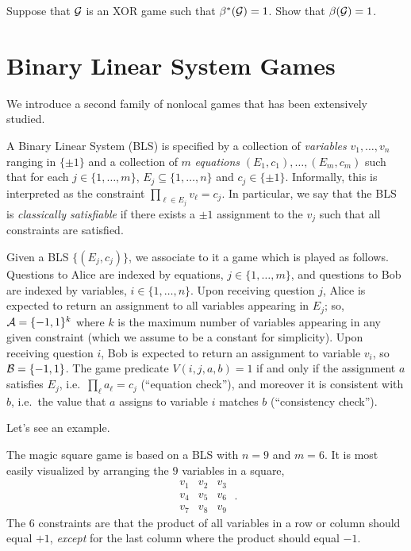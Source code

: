 \begin{exercise}
Suppose that $\mathcal{G}$ is an XOR game such that $\beta^*(\mathcal{G})=1$. Show that $\beta(\mathcal{G})=1$. 
\end{exercise}

\section{Binary Linear System Games}

We introduce a second family of nonlocal games that has been extensively studied. 

A Binary Linear System (BLS) is specified by a collection of \emph{variables} $v_1,\ldots,v_n$ ranging in $\{\pm 1\}$ and a collection of $m$ \emph{equations} $(E_1,c_1),\ldots,(E_m,c_m)$ such that for each $j\in\{1,\ldots,m\}$, $E_j \subseteq \{1,\ldots,n\}$ and $c_j\in\{\pm 1\}$. Informally, this is interpreted as the constraint $\prod_{\ell\in E_j} v_\ell = c_j$. In particular, we say that the BLS is \emph{classically satisfiable} if there exists a $\pm1$ assignment to the $v_j$ such that all constraints are satisfied. 

Given a BLS $\{(E_j,c_j)\}$, we associate to it a game which is played as follows. Questions to Alice are indexed by equations, $j\in \{1,\ldots,m\}$, and questions to Bob are indexed by variables, $i\in \{1,\ldots,n\}$. 
Upon receiving question $j$, Alice is expected to return an assignment to all variables appearing in $E_j$; so, $\mathcal{A}=\{-1,1\}^k$ where $k$ is the maximum number of variables appearing in any given constraint (which we  assume to be a constant for simplicity). Upon receiving question $i$, Bob  is expected to return an assignment to variable $v_i$, so $\mathcal{B}=\{-1,1\}$.  The game predicate $V(i,j,a,b)=1$ if and only if the assignment $a$ satisfies $E_j$, i.e.\ $\prod_\ell a_\ell = c_j$ (``equation check''), and moreover it is consistent with $b$, i.e.\ the value that $a$ assigns to variable $i$ matches $b$ (``consistency check''). 


Let's see an example. 

\begin{example}
The magic square game is based on a BLS with $n=9$ and $m=6$. It is most easily visualized by arranging the $9$ variables in a square, 
\[\begin{matrix} v_1 & v_2 & v_3 \\ v_4 & v_5 & v_6 \\ v_7 & v_8 & v_9 \end{matrix}\;.\]
The $6$ constraints are that the product of all variables in a row or column should equal $+1$, \emph{except} for the last column where the product should equal $-1$.
\end{example}

